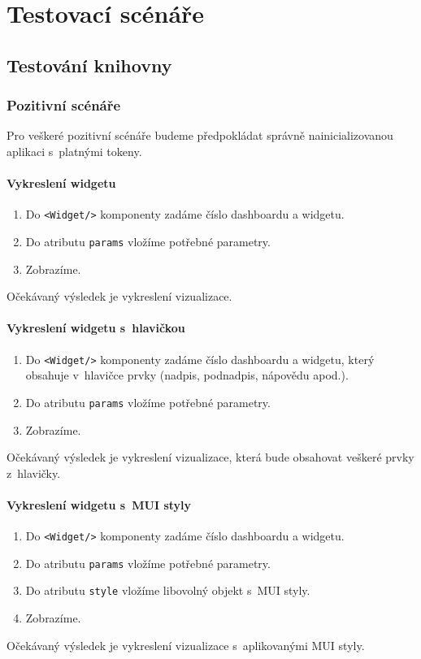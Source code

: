 \documentclass[czech, bc, kiv, he, iso690numb]{fasthesis}
\begin{document}
\chapter{Testovací scénáře}\label{app:testCases}
\section{Testování knihovny}
\subsection{Pozitivní scénáře}
Pro veškeré pozitivní scénáře budeme předpokládat správně nainicializovanou aplikaci s~platnými tokeny.
\subsubsection{Vykreslení widgetu}
\begin{enumerate}
	\item Do \texttt{<Widget/>} komponenty zadáme číslo dashboardu a widgetu.
	\item Do atributu \texttt{params} vložíme potřebné parametry.
	\item Zobrazíme.
\end{enumerate}
Očekávaný výsledek je vykreslení vizualizace.

\subsubsection{Vykreslení widgetu s~hlavičkou}
\begin{enumerate}
	\item Do \texttt{<Widget/>} komponenty zadáme číslo dashboardu a widgetu, který obsahuje v~hlavičce prvky (nadpis, podnadpis, nápovědu apod.).
	\item Do atributu \texttt{params} vložíme potřebné parametry.
	\item Zobrazíme.
\end{enumerate}
Očekávaný výsledek je vykreslení vizualizace, která bude obsahovat veškeré prvky z~hlavičky.

\subsubsection{Vykreslení widgetu s~MUI styly}
\begin{enumerate}
	\item Do \texttt{<Widget/>} komponenty zadáme číslo dashboardu a widgetu.
	\item Do atributu \texttt{params} vložíme potřebné parametry.
	\item Do atributu \texttt{style} vložíme libovolný objekt s~MUI styly.
	\item Zobrazíme.
\end{enumerate}
Očekávaný výsledek je vykreslení vizualizace s~aplikovanými MUI styly.
\end{document}
